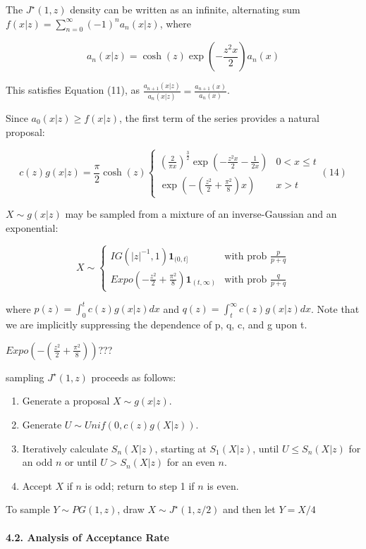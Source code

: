 \documentclass[
]{article}
\begin{document}
The \(J^\star(1,z)\) density can be written as an infinite, alternating
sum \(f(x|z)=\sum_{n=0}^\infty(-1)^na_n(x|z)\), where

\[a_n(x|z)=\cosh(z)\exp\left(-\frac{z^{2}x}2\right)a_n(x)\]

This satisfies Equation (11), as
\(\frac{a_{n+1}(x|z)}{a_n(x|z)}=\frac{a_{n+1}(x)}{a_n(x)}\).

Since \(a_0(x|z)\ge f(x|z)\), the first term of the series provides a
natural proposal:

\[c(z) g(x|z)=\frac{\pi}2\cosh(z)\begin{cases}(\frac{2}{\pi x})^{\frac32}\exp\left(-\frac{z^{2}x}2-\frac{1}{2x}\right) & 0<x\le t\\ \exp\left(-(\frac{z^{2}}2+\frac{\pi^{2}}8)x\right) & x>t\end{cases}(14)\]

\(X\sim g(x|z)\) may be sampled from a mixture of an inverse-Gaussian
and an exponential:

\[X\sim \begin{cases}IG(|z|^{-1},1)\mathbf{1}_{(0,t]} & \text{with prob } \frac{p}{p+q}\\ Expo(-\frac{z^{2}}2+\frac{\pi^{2}}8)\mathbf{1}_{(t,\infty)} & \text{with prob } \frac{q}{p+q}\end{cases}\]

where \(p(z) =\int^t_0 c(z) g(x|z)dx\) and
\(q(z) =\int_t^\infty c(z) g(x|z)dx\). Note that we are implicitly
suppressing the dependence of p, q, c, and g upon t.

{\(Expo(-(\frac{z^{2}}2+\frac{\pi^{2}}8))\)???}

sampling \(J^\star(1,z)\) proceeds as follows:

\begin{enumerate}
\def\labelenumi{\arabic{enumi}.}
\item
  Generate a proposal \(X\sim g(x|z)\).
\item
  Generate \(U\sim Unif(0,c(z)g(X|z))\).
\item
  Iteratively calculate \(S_n (X|z)\), starting at \(S_1(X|z)\), until
  \(U\le S_n(X|z)\) for an odd \(n\) or until \(U>S_n (X|z)\) for an
  even \(n\).
\item
  Accept \(X\) if \(n\) is odd; return to step 1 if \(n\) is even.
\end{enumerate}

To sample \(Y\sim PG(1, z)\), draw \(X\sim J^\star(1,z/2)\) and then let
\(Y=X/4\)

\hypertarget{analysis-of-acceptance-rate}{%
\paragraph{4.2. Analysis of Acceptance
Rate}\label{analysis-of-acceptance-rate}}
\end{document}
